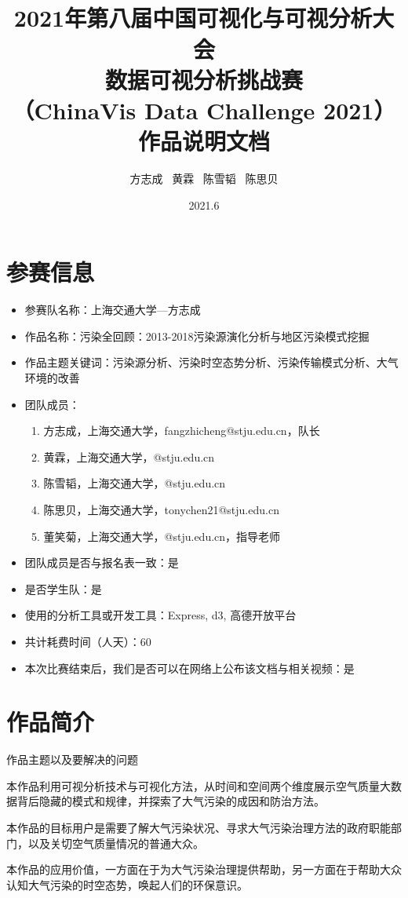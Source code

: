 \documentclass[UTF8]{ctexrep}
\title{
    \horrule{0.5pt} \\[0.4cm]
    \huge 2021年第八届中国可视化与可视分析大会\\
    数据可视分析挑战赛\\
    （ChinaVis Data Challenge 2021）\\
    作品说明文档\\
    \horrule{2pt}
}
\author{
    方志成 \ 黄霖 \ 陈雪韬 \ 陈思贝
}
\date{
    2021.6
}
\begin{document}
    \maketitle

    \section{参赛信息}

    \begin{itemize}
        \item 参赛队名称：上海交通大学—方志成
        \item 作品名称：污染全回顾：2013-2018污染源演化分析与地区污染模式挖掘
        \item 作品主题关键词：污染源分析、污染时空态势分析、污染传输模式分析、大气环境的改善
        \item 团队成员：
        \begin{enumerate}
            \item 方志成，上海交通大学，fangzhicheng@stju.edu.cn，队长
            \item 黄霖，上海交通大学，@stju.edu.cn
            \item 陈雪韬，上海交通大学，@stju.edu.cn
            \item 陈思贝，上海交通大学，tonychen21@stju.edu.cn
            \item 董笑菊，上海交通大学，@stju.edu.cn，指导老师
        \end{enumerate}
        \item 团队成员是否与报名表一致：是
        \item 是否学生队：是
        \item 使用的分析工具或开发工具：Express, d3, 高德开放平台
        \item 共计耗费时间（人天）：60
        \item 本次比赛结束后，我们是否可以在网络上公布该文档与相关视频：是\\
    \end{itemize}

    \section{作品简介}

    作品主题以及要解决的问题
    \par
    本作品利用可视分析技术与可视化方法，从时间和空间两个维度展示空气质量大数据背后隐藏的模式和规律，并探索了大气污染的成因和防治方法。
    \par
    本作品的目标用户是需要了解大气污染状况、寻求大气污染治理方法的政府职能部门，以及关切空气质量情况的普通大众。
    \par
    本作品的应用价值，一方面在于为大气污染治理提供帮助，另一方面在于帮助大众认知大气污染的时空态势，唤起人们的环保意识。\\
\end{document}
